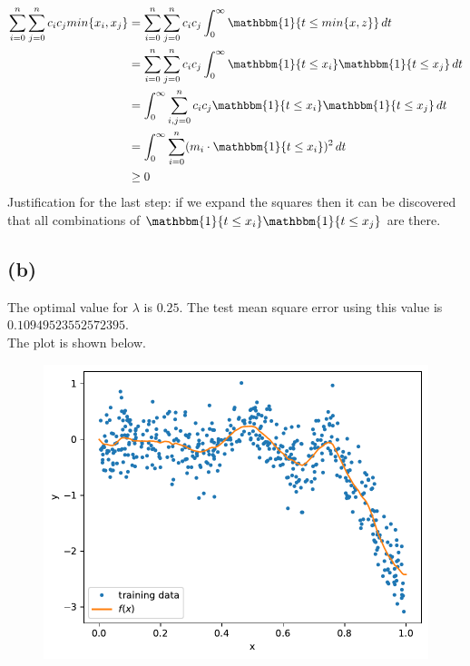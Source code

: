 \documentclass[11pt]{article}
\begin{document}
\begin{equation}
    \begin{split}
        \sum_{i=0}^n \sum_{j=0}^n c_i c_j min\{x_i, x_j\} &= \sum_{i=0}^n \sum_{j=0}^n c_i c_j \int_{0}^{\infty}{\mathbbm{1}\{t\leq min\{x,z\}\} \, dt} \\
        &= \sum_{i=0}^n \sum_{j=0}^n c_i c_j \int_{0}^{\infty}{\mathbbm{1}\{t\leq x_i\} \mathbbm{1}\{t\leq x_j\} \, dt} \\
        &= \int_{0}^{\infty}{ \sum_{i,j=0}^n c_i c_j \mathbbm{1}\{t\leq x_i\} \mathbbm{1}\{t\leq x_j\} \, dt} \\
        &= \int_{0}^{\infty}{ \sum_{i=0}^n (m_i \cdot \mathbbm{1}\{t\leq x_i\})^2 \, dt} \\
        &\geq 0
    \end{split}
\end{equation}
Justification for the last step: if we expand the squares then it can be discovered that all combinations of $\mathbbm{1}\{t\leq x_i\} \mathbbm{1}\{t\leq x_j\}$ are there.

\subsection*{(b)}
The optimal value for $\lambda$ is $0.25$. The test mean square error using this value is $0.10949523552572395$. \\
The plot is shown below. \\
\begin{figure}[H]
    \centering
    \includegraphics[scale=0.8]{images/hw4reg.pdf}
\end{figure}
\end{document}
